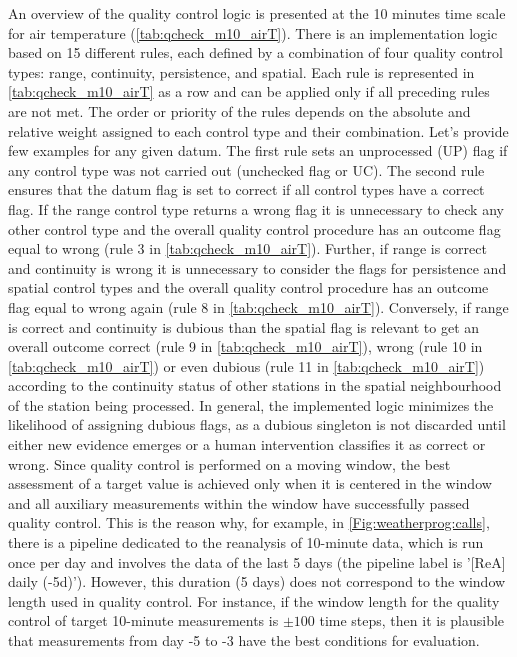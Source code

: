 \documentclass[authoryear,preprint,review,12pt]{elsarticle}
\begin{document}
An overview of the quality control logic is presented at the 10 minutes time scale for air temperature (\cref{tab:qcheck_m10_airT}).
There is an implementation logic based on 15 different rules, each defined by a combination of four quality control types: range, continuity, persistence, and spatial.
Each rule is represented in \cref{tab:qcheck_m10_airT} as a row and can be applied only if all preceding rules are not met.
The order or priority of the rules depends on the absolute and relative weight assigned to each control type and their combination.
Let's provide few examples for any given datum.
The first rule sets an unprocessed (UP) flag if any control type was not carried out (unchecked flag or UC).
The second rule ensures that the datum flag is set to correct if all control types have a correct flag.
If the range control type returns a wrong flag it is unnecessary to check any other control type and the overall quality control procedure has an outcome flag equal to wrong (rule 3 in \cref{tab:qcheck_m10_airT}).
Further, if range is correct and continuity is wrong it is unnecessary to consider the flags for persistence and spatial control types and the overall quality control procedure has an outcome flag equal to wrong again (rule 8 in \cref{tab:qcheck_m10_airT}).
Conversely, if range is correct and continuity is dubious than the spatial flag is relevant to get an overall outcome correct (rule 9 in \cref{tab:qcheck_m10_airT}), wrong (rule 10 in \cref{tab:qcheck_m10_airT}) or even dubious (rule 11 in \cref{tab:qcheck_m10_airT}) according to the continuity status of other stations in the spatial neighbourhood of the station being processed.
In general, the implemented logic minimizes the likelihood of assigning dubious flags, as a dubious singleton is not discarded until either new evidence emerges or a human intervention classifies it as correct or wrong. 
Since quality control is performed on a moving window, the best assessment of a target value is achieved only when it is centered in the window and all auxiliary measurements within the window have successfully passed quality control. 
This is the reason why, for example, in \cref{Fig:weatherprog:calls}, there is a pipeline dedicated to the reanalysis of 10-minute data, which is run once per day and involves the data of the last 5 days (the pipeline label is '[ReA] daily (-5d)').
However, this duration (5 days) does not correspond to the window length used in quality control.
For instance, if the window length for the quality control of target 10-minute measurements is $\pm100$ time steps, then it is plausible that measurements from day -5 to -3 have the best conditions for evaluation.
\end{document}

